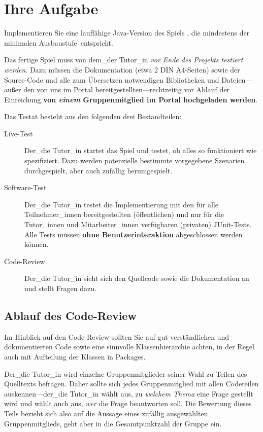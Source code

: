 \section{Ihre Aufgabe}
\label{sec:aufgabe}

Implementieren Sie eine lauff\"ahige Java-Version des Spiels \emph{\gameTitle}, die
mindestens der \glqq minimalen Ausbaustufe\grqq\ entspricht. 

Das fertige Spiel muss von dem\_der Tutor\_in \emph{vor Ende des Projekts testiert werden}.
Dazu müssen die Dokumentation (etwa 2 DIN A4-Seiten) sowie der Source-Code und
alle zum Übersetzen notwendigen Bibliotheken und Dateien---au\ss{}er den von uns
im Portal bereitgestellten---rechtzeitig vor Ablauf der Einreichung \textbf{von \textit{einem} Gruppenmitglied im Portal hochgeladen werden}.

Das Testat besteht aus den folgenden drei Bestandteilen:

\begin{description}
\item[Live-Test] Der\_die Tutor\_in startet das Spiel und testet, ob alles so funktioniert wie spezifiziert.
Dazu werden potenzielle bestimmte vorgegebene Szenarien durchgespielt, aber auch
zufällig \glqq{}herumgespielt\grqq{}.

\item[Software-Test] Der\_die Tutor\_in testet die Implementierung mit den für alle
Teilnehmer\_innen bereitgestellten (\"offentlichen) und nur f\"ur die Tutor\_innen und
Mitarbeiter\_innen verf\"ugbaren (privaten) JUnit-Tests. Alle Tests m\"ussen
\textbf{ohne Benutzerinteraktion} abgeschlossen werden k\"onnen.

\item[Code-Review] Der\_die Tutor\_in sieht sich den Quellcode sowie die Dokumentation an
und stellt Fragen dazu.
\end{description}


\subsection{Ablauf des Code-Review}
\label{sec:codeReview}

Im Hinblick auf den Code-Review sollten Sie auf gut verst\"andlichen und
dokumentierten Code sowie eine sinnvolle Klassenhierarchie achten, in der Regel
auch mit Aufteilung der Klassen in Packages.

Der\_die Tutor\_in wird einzelne Gruppenmitglieder seiner Wahl zu Teilen des Quelltexts befragen.
Daher sollte sich jedes Gruppenmitglied mit allen Codeteilen auskennen---der\_die Tutor\_in
w\"ahlt aus, zu \emph{welchem Thema} eine Frage gestellt wird und w\"ahlt auch aus, \emph{wer}
die Frage beantworten soll. Die Bewertung dieses Teils bezieht sich also auf die
Aussage eines \glqq{}zuf\"allig ausgew\"ahlten\grqq{} Gruppenmitglieds, geht
aber in die Gesamtpunktzahl der Gruppe ein. 

